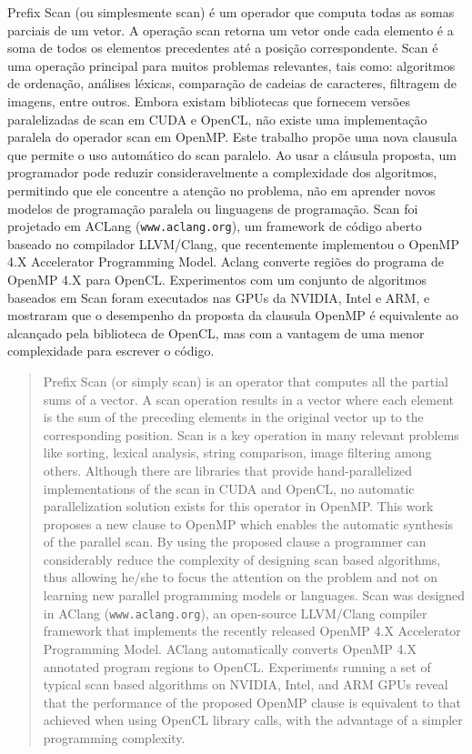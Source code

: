 \documentclass[Ingles]{ic-tese-v1}
\begin{document}
\begin{resumo}
Prefix Scan (ou simplesmente scan) é um operador que computa todas as somas
parciais de um vetor. A operação scan retorna um vetor onde cada elemento é a
soma de todos os elementos precedentes até a posição correspondente. Scan é uma
operação principal para muitos problemas relevantes, tais como: algoritmos de
ordenação, análises léxicas, comparação de cadeias de caracteres, filtragem de
imagens, entre outros. Embora existam bibliotecas que fornecem versões
paralelizadas de scan em CUDA e OpenCL, não existe uma implementação paralela
do operador scan em OpenMP. Este trabalho propõe uma nova clausula que permite
o uso automático do scan paralelo. Ao usar a cláusula proposta, um programador
pode reduzir consideravelmente a complexidade dos algoritmos, permitindo que
ele concentre a atenção no problema, não em aprender novos modelos de
programação paralela ou linguagens de programação. Scan foi projetado em ACLang
(\texttt{www.aclang.org}), um framework de código aberto baseado no compilador
LLVM/Clang, que recentemente implementou o OpenMP 4.X Accelerator Programming
Model. Aclang converte regiões do programa de OpenMP 4.X para OpenCL.
Experimentos com um conjunto de algoritmos baseados em Scan foram executados
nas GPUs da NVIDIA, Intel e ARM, e mostraram que o desempenho da proposta da
clausula OpenMP é equivalente ao alcançado pela biblioteca de OpenCL, mas com a
vantagem de uma menor complexidade para escrever o código.
\end{resumo}

\begin{abstract}
  Prefix Scan  (or simply scan) is  an operator that computes  all the
  partial sums of a vector. A scan operation results in a vector where
  each element  is the sum of  the preceding elements in  the original
  vector up to the corresponding position.  Scan is a key operation in
  many  relevant  problems  like  sorting,  lexical  analysis,  string
  comparison,  image  filtering  among   others.  Although  there  are
  libraries  that provide  hand-parallelized  implementations  of the scan
  in  CUDA and OpenCL,  no automatic parallelization solution exists
  for this operator in  OpenMP. This work proposes a new  clause
  to OpenMP which  enables  the  automatic synthesis of the
  parallel  scan.  By   using  the  proposed  clause   a  programmer  can
  considerably  reduce   the  complexity   of  designing   scan  based
  algorithms, thus allowing he/she to focus the attention on the problem
  and not on  learning new  parallel  programming  models  or
  languages.  Scan was designed  in AClang (\texttt{www.aclang.org}),
  an open-source LLVM/Clang compiler  framework     that  implements  the
  recently released OpenMP 4.X Accelerator Programming Model.
  AClang automatically converts OpenMP 4.X annotated program regions
  to OpenCL. Experiments running a  set of typical scan  based  algorithms
  on NVIDIA, Intel, and ARM GPUs reveal that  the performance
  of  the  proposed  OpenMP  clause  is equivalent to that achieved when using
  OpenCL library calls, with the advantage of  a
  simpler programming  complexity.
\end{abstract}
\end{document}
